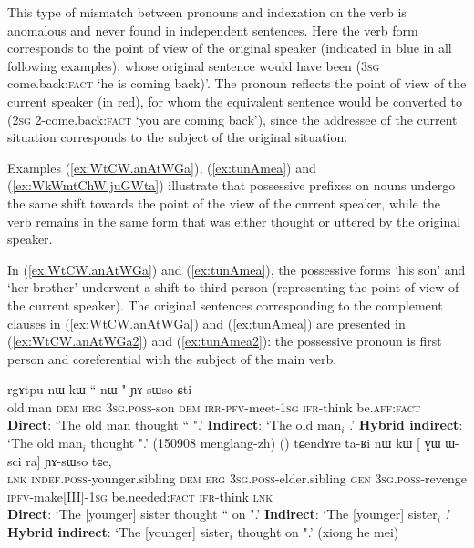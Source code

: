 This type of mismatch between pronouns and indexation on the verb is anomalous and never found in independent sentences. Here the verb form corresponds to the point of view of the original speaker (indicated in blue in all following examples), whose original sentence would have been  (\textsc{3sg} {come.back:\textsc{fact}} `he is coming back)'. The pronoun reflects the point of view of the current speaker (in red), for whom the equivalent sentence would be converted to  (\textsc{2sg} {2-come.back:\textsc{fact}} `you are coming back'), since the addressee of the current situation corresponds to the subject of the original situation.

Examples (\ref{ex:WtCW.anAtWGa}), (\ref{ex:tunAmea}) and (\ref{ex:WkWmtChW.juGWta}) illustrate that possessive prefixes on nouns undergo the same shift towards the point of the view of the current speaker, while the verb remains in the same form that was either thought or uttered by the original speaker.

In (\ref{ex:WtCW.anAtWGa}) and (\ref{ex:tunAmea}), the possessive forms  `his son' and `her brother'  underwent a shift to third person (representing the point of view of the current speaker). The original sentences corresponding to the complement clauses in (\ref{ex:WtCW.anAtWGa}) and (\ref{ex:tunAmea}) are presented in (\ref{ex:WtCW.anAtWGa2}) and (\ref{ex:tunAmea2}): the possessive pronoun is first person and coreferential with the subject of the main verb.
 
\begin{exe}
\ex 
\begin{xlist}
\ex \label{ex:WtCW.anAtWGa}
\gll rgɤtpu nɯ kɯ `` nɯ " ɲɤ-sɯso ɕti \\
old.man \textsc{dem} \textsc{erg} \textsc{3sg}.\textsc{poss}-son \textsc{dem} \textsc{irr}-\textsc{pfv}-meet-\textsc{1sg} \textsc{ifr}-think be.\textsc{aff}:\textsc{fact} \\
\glt  \textbf{Direct}: `The old man thought `` ".'
\glt  \textbf{Indirect}:  `The old man$_i$ .'
\glt  \textbf{Hybrid indirect}:  `The old man$_i$ thought  ".' (150908 menglang-zh)
()
\ex \label{ex:tunAmea}
\gll tɕendɤre ta-ʁi nɯ kɯ [ ɣɯ ɯ-sci  ra] ɲɤ-sɯso tɕe, \\
\textsc{lnk}  \textsc{indef}.\textsc{poss}-younger.sibling \textsc{dem} \textsc{erg}  {\textsc{3sg}.\textsc{poss}-elder.sibling}  \textsc{gen} \textsc{3sg}.\textsc{poss}-revenge {\textsc{ipfv}-make[III]-\textsc{1sg}} be.needed:\textsc{fact} \textsc{ifr}-think \textsc{lnk} \\
\glt  \textbf{Direct}: `The [younger] sister thought `` on ".'
\glt  \textbf{Indirect}:  `The [younger] sister$_i$ .'
\glt  \textbf{Hybrid indirect}:  `The [younger] sister$_i$ thought  on ".' (xiong he mei)
\end{xlist}
\end{exe} 

